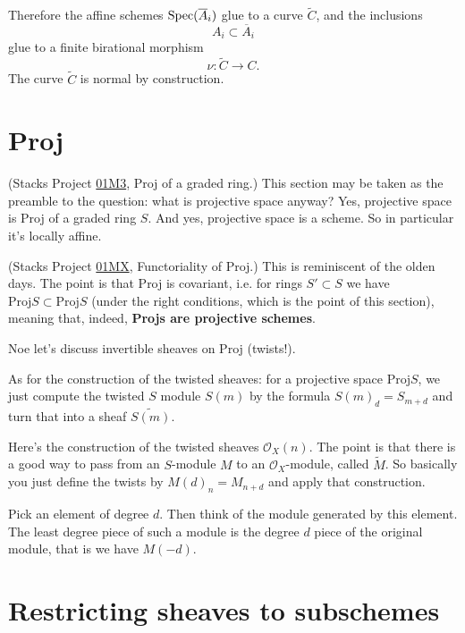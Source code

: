 Therefore the affine schemes
$\mathop{\mathrm{Spec}}(\overline A_i)$ glue to a curve
$\widetilde C$, and the inclusions
$$
A_i\subset \overline A_i
$$
glue to a finite birational morphism
$$
\nu:\widetilde C\to C.
$$
The curve $\widetilde C$ is normal by
construction.


\section{Proj}
\label{section-proj}

\noindent
(Stacks Project
\href{https://stacks.math.columbia.edu/tag/%
01M3}{01M3},
Proj of a graded ring.)
This section may be taken as the preamble to
the question: what is projective space
anyway?
Yes, projective space is Proj of a graded
ring $S$.
And yes, projective space is a scheme.
So in particular it's locally affine.

(Stacks Project
\href{https://stacks.math.columbia.edu/tag/%
01MX}{01MX},
Functoriality of Proj.)
This is reminiscent of the olden days.
The point is that Proj is covariant,
i.e. for rings  $S' \subset S$ we have
$\text{Proj}S \subset \text{Proj}S$
(under the right conditions,
which is the point of this section),
meaning that, indeed,
{\bf Projs are projective schemes}.






\medskip\noindent
Noe let's discuss invertible sheaves on Proj
(twists!).

\noindent
As for the construction of the twisted
sheaves:
for a projective space $\text{Proj} S$,
we just compute the twisted $S$ module
$S(m)$ by the formula $S(m)_d=S_{m+d}$
and turn that into a sheaf
$\widetilde{S(m)}$.

Here's the construction of the twisted
sheaves $\mathcal{O}_X(n)$.
The point is that there is a good way
to pass from an $S$-module $M$ to an
$\mathcal{O}_X$-module, called
$\widetilde{M}$.
So basically you just define the twists
by $M(d)_n=M_{n+d}$ and apply that
construction.

Pick an element of degree $d$.
Then think of the module generated by this
element.
The least degree piece of such a module
is the degree $d$ piece of the original
module,
that is we have $M(-d)$.










\section{Restricting sheaves to subschemes}
\label{section-restricting-sheaves}

